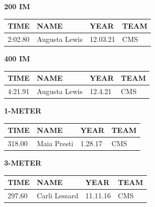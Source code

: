 \begin{table}[H]
\centering
\begin{minipage}[t]{0.48\textwidth}
\centering
\textbf{200 IM}\\[0.1cm]
\begin{tabular}{@{}p{1.8cm}p{2.8cm}p{1.2cm}p{1.4cm}@{}}
\hline
    \textbf{TIME} & \textbf{NAME} & \textbf{YEAR} & \textbf{TEAM} \\
\hline
    2:02.80 & Augusta Lewis & 12.03.21 & CMS \\
\hline
\end{tabular}
\end{minipage}\hfill
\begin{minipage}[t]{0.48\textwidth}
\centering
\textbf{400 IM}\\[0.1cm]
\begin{tabular}{@{}p{1.8cm}p{2.8cm}p{1.2cm}p{1.4cm}@{}}
\hline
    \textbf{TIME} & \textbf{NAME} & \textbf{YEAR} & \textbf{TEAM} \\
\hline
    4:21.91 & Augusta Lewis & 12.4.21 & CMS \\
\hline
\end{tabular}
\end{minipage}
\end{table}

\begin{table}[H]
\centering
\begin{minipage}[t]{0.6\textwidth}
\centering
\textbf{1-METER}\\[0.1cm]
\begin{tabular}{@{}p{1.8cm}p{2.8cm}p{1.2cm}p{1.4cm}@{}}
\hline
    \textbf{TIME} & \textbf{NAME} & \textbf{YEAR} & \textbf{TEAM} \\
\hline
    318.00 & Maia Presti & 1.28.17 & CMS \\
\hline
\end{tabular}
\end{minipage}
\end{table}

\begin{table}[H]
\centering
\begin{minipage}[t]{0.6\textwidth}
\centering
\textbf{3-METER}\\[0.1cm]
\begin{tabular}{@{}p{1.8cm}p{2.8cm}p{1.2cm}p{1.4cm}@{}}
\hline
    \textbf{TIME} & \textbf{NAME} & \textbf{YEAR} & \textbf{TEAM} \\
\hline
    297.60 & Carli Lessard & 11.11.16 & CMS \\
\hline
\end{tabular}
\end{minipage}
\end{table}

